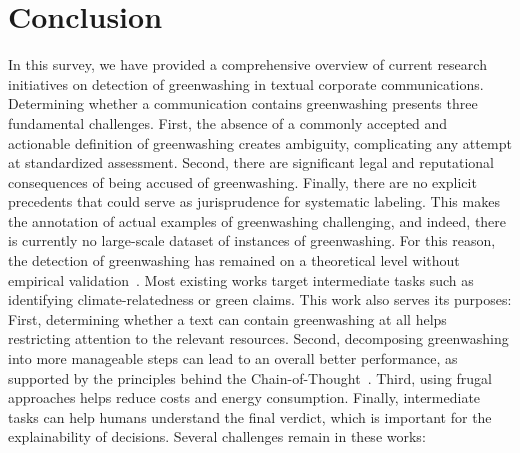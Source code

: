 \section{Conclusion}
\label{sec:conclusion}



In this survey, we have provided a comprehensive overview of current research initiatives on detection of greenwashing in textual corporate communications.  
Determining whether a communication contains greenwashing presents three fundamental challenges. First, the absence of a commonly accepted and actionable definition of greenwashing creates ambiguity, complicating any attempt at standardized assessment. Second, there are significant legal and reputational consequences of being accused of greenwashing. Finally, there are no explicit precedents that could serve as jurisprudence for systematic labeling.
This makes the annotation of actual examples of greenwashing challenging, and indeed, there is currently no large-scale dataset of instances of greenwashing.
For this reason, the detection of greenwashing has remained on a theoretical level without empirical validation~\cite{moodaley_conceptual_2023}. 
Most existing works target intermediate tasks such as identifying climate-relatedness or green claims. This work also serves its purposes: First, determining whether a text can contain greenwashing at all helps restricting attention to the relevant resources.  
Second, decomposing greenwashing into more manageable steps can lead to an overall better performance, as supported by the principles behind the Chain-of-Thought~\cite{cot}. 
Third, using frugal approaches helps reduce costs and energy consumption.
Finally, intermediate tasks can help humans understand the final verdict, which is important for the explainability of decisions. 
Several challenges remain in these works: 
